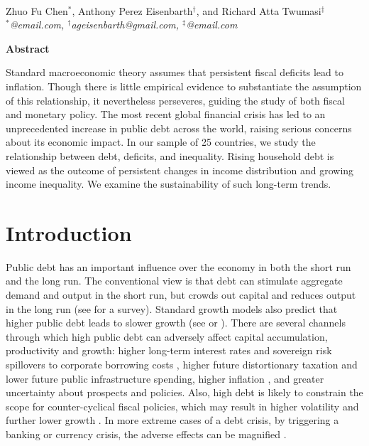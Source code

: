 \documentclass[12pt, titlepage]{article}
\date{}
\numberwithin{equation}{section}
\begin{document}
	\begin{titlepage}
		\centering
		\LARGE{}\\
		\vspace{5mm}
		\normalsize{Zhuo Fu Chen\(^\ast\), Anthony Perez Eisenbarth\(^\dagger\),
			and Richard Atta Twumasi\(^\ddagger\)}\\ \vspace{5mm}
		\textit{
			\vspace{1mm}
			\(^\ast\)@email.com, \(^\dagger\)ageisenbarth@gmail.com, \(^\ddagger\)@email.com
		}
	\begin{Center}
		\textbf{Abstract}
	\end{Center}
\justifying
Standard macroeconomic theory assumes that persistent fiscal deficits
lead to inflation. Though there is little empirical evidence to substantiate the
assumption of this relationship, it nevertheless perseveres, guiding the study
of both fiscal and monetary policy. The most recent global financial crisis
has led to an unprecedented increase in public debt across the world, raising
serious concerns about its economic impact. In our sample of 25 countries, we
study the relationship between debt, deficits, and inequality. Rising household
debt is viewed as the outcome of persistent changes in income distribution
and growing income inequality. We examine the sustainability of such long-term trends.
\end{titlepage}
	\tableofcontents 
	\cleardoublepage

\section{Introduction}

Public debt has an important influence over the economy in both the
short run and the long run. The conventional view is that debt can stimulate aggregate demand
and output in the short run, but crowds out capital and reduces output in the long run (see
\cite{Mankiw1999} for a survey). Standard growth models also predict that higher
public debt leads to slower growth (see \cite{Saint-Paul91} or \cite{Aizeman07}). There are several channels through which high public debt can adversely affect
capital accumulation, productivity and growth: higher long-term interest rates and sovereign
risk spillovers to corporate borrowing costs \citep{Gale2003, Cecchetti2015, Corsetti2013}, higher future distortionary taxation and lower future public infrastructure spending, higher inflation \citep{Barro95}, and greater uncertainty about prospects and policies. Also, high debt
is likely to constrain the scope for counter-cyclical fiscal policies, which may result in higher
volatility and further lower growth \citep{Woo2015}. In more extreme cases of a
debt crisis, by triggering a banking or currency crisis, the adverse effects can be magnified
\citep{Reinhart2011, Reinhart2012}.
\end{document}
